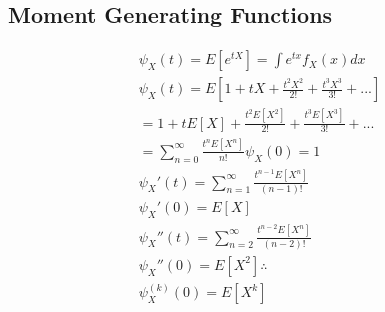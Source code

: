 \documentclass[11pt,a4paper,margin=1in]{article}
\begin{document}
\subsection{Moment Generating Functions}
\begin{gather*}
    \psi_X(t) = E[e^{tX}] = \int e^{tx} f_X(x) dx\\
    \psi_X(t) = E[1 + tX + \frac{t^2 X^2}{2!} + \frac{t^3 X^3}{3!} + ...] \\
    = 1 + tE[X] + \frac{t^2 E[X^2]}{2!} + \frac{t^3 E[X^3]}{3!} + ... \\
    = \sum_{n=0}^{\infty} \frac{t^n E[X^n]}{n!}
    \psi_X(0) = 1 \\
    \psi_X'(t) = \sum_{n=1}^{\infty} \frac{t^{n-1} E[X^n]}{(n-1)!} \\
    \psi_X'(0) = E[X] \\
    \psi_X''(t) = \sum_{n=2}^{\infty} \frac{t^{n-2} E[X^n]}{(n-2)!} \\
    \psi_X''(0) = E[X^2] \therefore \\
    \psi_X^{(k)}(0) = E[X^k]
\end{gather*}
\end{document}
